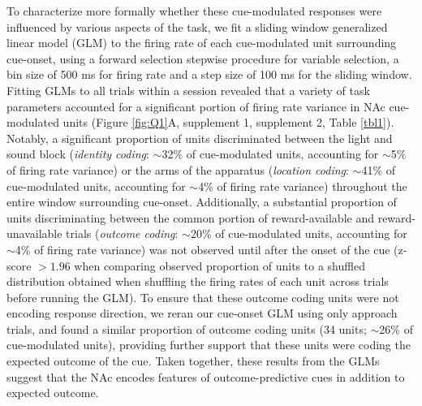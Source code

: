 \documentclass[11pt]{article}
\begin{document}
To characterize more formally whether these cue-modulated responses were influenced by various aspects of the task, we fit a sliding window generalized linear model (GLM) to the firing rate of each cue-modulated unit surrounding cue-onset, using a forward selection stepwise procedure for variable selection, a bin size of 500 ms for firing rate and a step size of 100 ms for the sliding window. Fitting GLMs to all trials within a session revealed that a variety of task parameters accounted for a significant portion of firing rate variance in NAc cue-modulated units (Figure \ref{fig:Q1}A, supplement 1, supplement 2, Table \ref{tbl1}). Notably, a significant proportion of units discriminated between the light and sound block ({\it identity coding}: $\sim$32\% of cue-modulated units, accounting for $\sim$5\% of firing rate variance) or the arms of the apparatus ({\it location coding}: $\sim$41\% of cue-modulated units, accounting for $\sim$4\% of firing rate variance) throughout the entire window surrounding cue-onset. Additionally, a substantial proportion of units discriminating between the common portion of reward-available and reward-unavailable trials ({\it outcome coding}: $\sim$20\% of cue-modulated units, accounting for $\sim$4\% of firing rate variance) was not observed until after the onset of the cue (z-score $>1.96$ when comparing observed proportion of units to a shuffled distribution obtained when shuffling the firing rates of each unit across trials before running the GLM). To ensure that these outcome coding units were not encoding response direction, we reran our cue-onset GLM using only approach trials, and found a similar proportion of outcome coding units (34 units; $\sim$26\% of cue-modulated units), providing further support that these units were coding the expected outcome of the cue. Taken together, these results from the GLMs suggest that the NAc encodes features of outcome-predictive cues in addition to expected outcome. 
\end{document}

